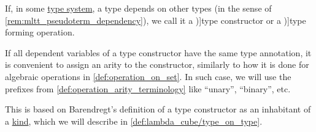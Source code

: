 \begin{concept}\label{con:type_constructor}\mimprovised
  If, in some \hyperref[def:abstract_type_system]{type system}, a type depends on other types (in the sense of \cref{rem:mltt_pseudoterm_dependency}), we call it a \term[en=type constructor (\cite[198]{Barendregt1992LambdaCalculiWithTypes})]{type constructor} or a \term[en=type forming operation (\cite[83]{MartinLöf1975IntuitionisticTypeTheory})]{type forming operation}.

  If all dependent variables of a type constructor have the same type annotation, it is convenient to assign an arity to the constructor, similarly to how it is done for algebraic operations in \cref{def:operation_on_set}. In such case, we will use the prefixes from \cref{def:operation_arity_terminology} like \enquote{unary}, \enquote{binary}, etc.
\end{concept}
\begin{comments}
  \item This is based on Barendregt's definition of a type constructor as an inhabitant of a \hyperref[con:type_universe]{kind}, which we will describe in \cref{def:lambda_cube/type_on_type}.
\end{comments}

